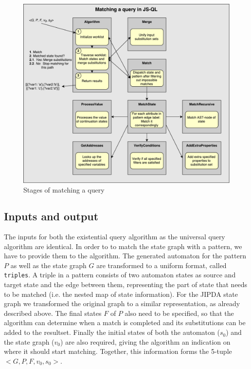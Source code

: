 \begin{figure}[!h]
    \centering
      \includegraphics[width=1\textwidth]{images/matchingEngine} 
      \caption{Stages of matching a query}
    \label{fig:matchingEngine}
\end{figure}

\subsection{Inputs and output}
\label{subsec:inputOutput}
The inputs for both the existential query algorithm as the universal query algorithm are identical. In order to to match the state graph with a pattern, we have to provide them to the algorithm. The generated automaton for the pattern $P$ as well as the state graph $G$ are transformed to a uniform format, called \texttt{triples}. A triple in a pattern consists of two automaton states as source and target state and the edge between them, representing the part of state that needs to be matched (i.e. the nested map of state information). For the JIPDA state graph we transformed the original graph to a similar representation, as already described above. The final states $F$ of $P$ also need to be specified, so that the algorithm can determine when a match is completed and its substitutions can be added to the resultset. Finally the initial states of both the automaton ($s_0$) and the state graph ($v_0$) are also required, giving the algorithm an indication on where it should start matching. Together, this information forms the 5-tuple $<G, P, F, v_0, s_0>$.

